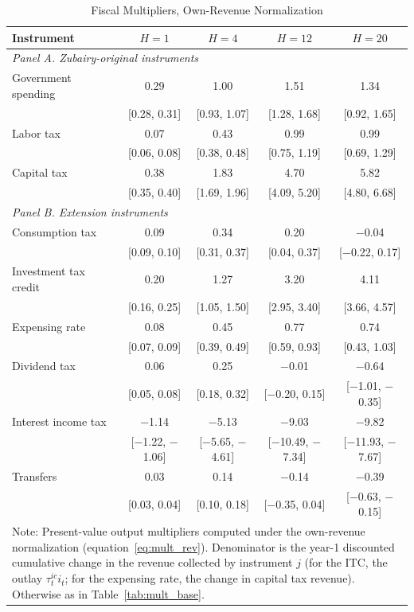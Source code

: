 \begin{table}[ht]
\centering
\caption{Fiscal Multipliers, Own-Revenue Normalization}
\label{tab:mult_rev}
\begin{tabular}{lcccc}
\hline\hline
Instrument & $H=1$ & $H=4$ & $H=12$ & $H=20$ \\
\hline
\multicolumn{5}{l}{\textit{Panel A. Zubairy-original instruments}} \\
Government spending & 0.29 & 1.00 & 1.51 & 1.34 \\
                    & [0.28, 0.31] & [0.93, 1.07] & [1.28, 1.68] & [0.92, 1.65] \\
Labor tax           & 0.07 & 0.43 & 0.99 & 0.99 \\
                    & [0.06, 0.08] & [0.38, 0.48] & [0.75, 1.19] & [0.69, 1.29] \\
Capital tax         & 0.38 & 1.83 & 4.70 & 5.82 \\
                    & [0.35, 0.40] & [1.69, 1.96] & [4.09, 5.20] & [4.80, 6.68] \\
\hline
\multicolumn{5}{l}{\textit{Panel B. Extension instruments}} \\
Consumption tax     & 0.09 & 0.34 & 0.20 & $-$0.04 \\
                    & [0.09, 0.10] & [0.31, 0.37] & [0.04, 0.37] & [$-$0.22, 0.17] \\
Investment tax credit & 0.20 & 1.27 & 3.20 & 4.11 \\
                    & [0.16, 0.25] & [1.05, 1.50] & [2.95, 3.40] & [3.66, 4.57] \\
Expensing rate      & 0.08 & 0.45 & 0.77 & 0.74 \\
                    & [0.07, 0.09] & [0.39, 0.49] & [0.59, 0.93] & [0.43, 1.03] \\
Dividend tax        & 0.06 & 0.25 & $-$0.01 & $-$0.64 \\
                    & [0.05, 0.08] & [0.18, 0.32] & [$-$0.20, 0.15] & [$-$1.01, $-$0.35] \\
Interest income tax & $-$1.14 & $-$5.13 & $-$9.03 & $-$9.82 \\
                    & [$-$1.22, $-$1.06] & [$-$5.65, $-$4.61] & [$-$10.49, $-$7.34] & [$-$11.93, $-$7.67] \\
Transfers           & 0.03 & 0.14 & $-$0.14 & $-$0.39 \\
                    & [0.03, 0.04] & [0.10, 0.18] & [$-$0.35, 0.04] & [$-$0.63, $-$0.15] \\
\hline\hline
\multicolumn{5}{p{0.85\textwidth}}{\footnotesize Note: Present-value output multipliers computed under the own-revenue normalization (equation~\ref{eq:mult_rev}). Denominator is the year-1 discounted cumulative change in the revenue collected by instrument $j$ (for the ITC, the outlay $\tau_t^{ic}i_t$; for the expensing rate, the change in capital tax revenue). Otherwise as in Table~\ref{tab:mult_base}.}
\end{tabular}
\end{table}
